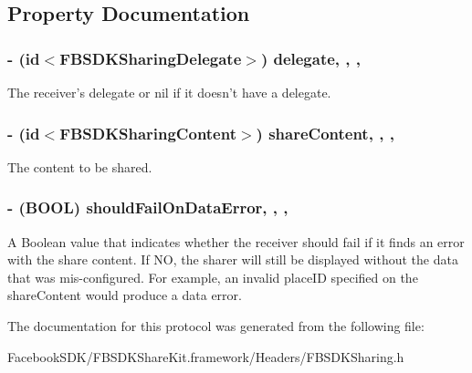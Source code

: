 \subsection{Property Documentation}
\hypertarget{protocol_f_b_s_d_k_sharing-p_a310585baeb89d309bda3879aaa1be72d}{
\subsubsection[{delegate}]{\setlength{\rightskip}{0pt plus 5cm}-\/ (id$<${\bf F\-B\-S\-D\-K\-Sharing\-Delegate}$>$) delegate\hspace{0.3cm}{\ttfamily [read]}, {\ttfamily [write]}, {\ttfamily [nonatomic]}, {\ttfamily [weak]}}}\label{protocol_f_b_s_d_k_sharing-p_a310585baeb89d309bda3879aaa1be72d}
The receiver's delegate or nil if it doesn't have a delegate. \hypertarget{protocol_f_b_s_d_k_sharing-p_a9cc352e3d8e8aec628ba42e8718bbeaf}{
\subsubsection[{share\-Content}]{\setlength{\rightskip}{0pt plus 5cm}-\/ (id$<${\bf F\-B\-S\-D\-K\-Sharing\-Content}$>$) share\-Content\hspace{0.3cm}{\ttfamily [read]}, {\ttfamily [write]}, {\ttfamily [nonatomic]}, {\ttfamily [copy]}}}\label{protocol_f_b_s_d_k_sharing-p_a9cc352e3d8e8aec628ba42e8718bbeaf}
The content to be shared. \hypertarget{protocol_f_b_s_d_k_sharing-p_ac1c01a21db7b956e8ea47df72f01d12d}{
\subsubsection[{should\-Fail\-On\-Data\-Error}]{\setlength{\rightskip}{0pt plus 5cm}-\/ (B\-O\-O\-L) should\-Fail\-On\-Data\-Error\hspace{0.3cm}{\ttfamily [read]}, {\ttfamily [write]}, {\ttfamily [nonatomic]}, {\ttfamily [assign]}}}\label{protocol_f_b_s_d_k_sharing-p_ac1c01a21db7b956e8ea47df72f01d12d}
A Boolean value that indicates whether the receiver should fail if it finds an error with the share content.  If N\-O, the sharer will still be displayed without the data that was mis-\/configured. For example, an invalid place\-I\-D specified on the share\-Content would produce a data error. 

The documentation for this protocol was generated from the following file\-:\begin{DoxyCompactItemize}
\item 
Facebook\-S\-D\-K/\-F\-B\-S\-D\-K\-Share\-Kit.\-framework/\-Headers/F\-B\-S\-D\-K\-Sharing.\-h\end{DoxyCompactItemize}
